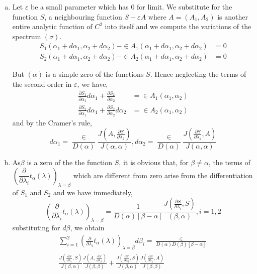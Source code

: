 \begin{enumerate}[a)]
\item  Let $\varepsilon $ be a small parameter which has $0$ for limit. We
  substitute for the function $S$, a neighbouring function $S - \varepsilon  A$
  where $A = (A_1,  A_2)$ is another entire analytic function of $C^2$
  into itself and we compute the variations of the spectrum
  $(\sigma)$. 
  \begin{align*}
    S_1(\alpha_1 + d \alpha_1,  \alpha_2 + d \alpha_2 ) - \in
    A_1(\alpha_1 + d \alpha_1,  \alpha_2 + d \alpha_2 ) & = 0\\ 
    S_2(\alpha_1 + d \alpha_1,  \alpha_2 + d \alpha_2 ) - \in
    A_2(\alpha_1 + d \alpha_1,  \alpha_2 + d \alpha_2 ) & = 0 
  \end{align*}

  But $(\alpha)$ is a simple zero of the functions $S$. Hence
  neglecting the terms of the second order in $\varepsilon $, we have, 
  \begin{align*}
    \frac{\partial S_1}{\partial \alpha_1} d \alpha_1 + \frac{\partial
      S_2}{\partial \alpha_2} & = \in A_1(\alpha_1,  \alpha_2 )\\ 
    \frac{\partial S_2}{\partial \alpha_1} d \alpha_1 + \frac{\partial
      S_2}{\partial \alpha_2} d \alpha_2 & = \in A_2 (\alpha_1,
    \alpha_2 ) 
  \end{align*}
  and by the Cramer's rule,
  $$
  d \alpha_1 = \frac{\in}{D(\alpha)} \frac{J(A, \frac{\partial
      S}{\partial \lambda_2})} { J(\alpha,  \alpha)},  d \alpha_2 =
  \frac{\in}{D(\alpha)} \frac{J( \frac{\partial S}{\partial
      \lambda_1},  A)} { J(\alpha,  \alpha)} 
  $$
\item As\pageoriginale $\beta$ is a zero of the the function $S$, it is obvious
  that, for $\beta \neq \alpha$, the terms of
  $\left(\dfrac{\partial}{\partial \lambda_i} t_\alpha (\lambda)\right)_{\lambda =
    \beta}$ which are different from zero arise from the
  differentiation of $S_1$ and $S_2$ and we have immediately, 
  $$
  \left(\frac{\partial}{\partial \lambda_i} t_\alpha (\lambda)\right)_{\lambda =
    \beta} = \frac{1}{D(\alpha) [\beta - \alpha]}  \frac{J\left(
    \frac{\partial S}{\partial \lambda_i},  S\right)} { (\beta,  \alpha )},
  i = 1, 2 
  $$
  substituting for $d \beta$, we obtain
  \begin{multline*}
    \sum^2_{i=1} \left(\frac{\partial}{\partial \lambda_i} t_\alpha
    (\lambda)\right)_{\lambda = \beta} d \beta_i = \frac{\in} {D(\alpha)
      D(\beta) [ \beta - \alpha]}\\  
    \frac{J\left( \frac{\partial S}{\partial
        \lambda_1},  S\right)} { J(\beta,  \alpha)} \frac{J \left(
      A, \frac{ \partial 
        S}{\partial \lambda_2} \right)} { J(\beta,  \beta)} + \frac{J\left(
      \frac{\partial S}{\partial \lambda_2},  S\right)} { J(\beta,  \alpha)}
    \frac{J\left( \frac{\partial S}{\partial \lambda_1},  A\right)} { J(\beta,
      \beta)} 
  \end{multline*}


\end{enumerate}
